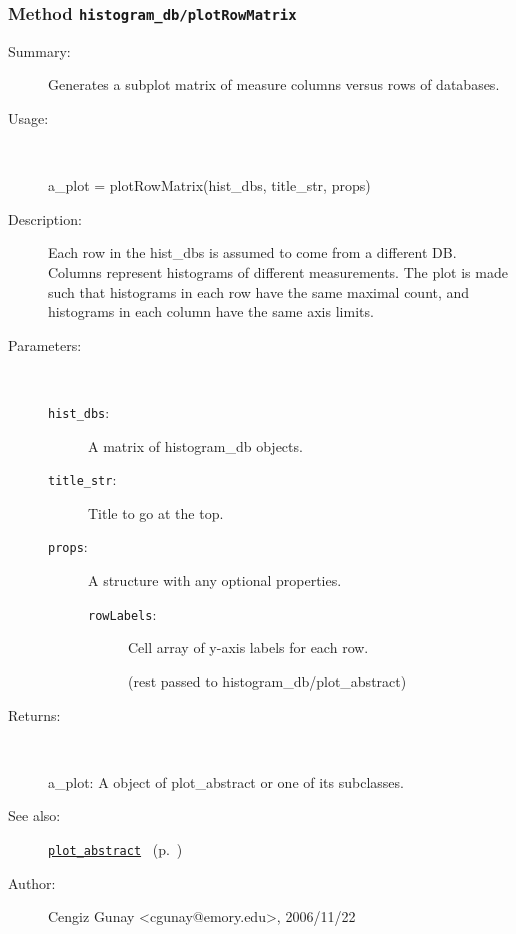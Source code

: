 \subsubsection[Method \texttt{plotRowMatrix}]{Method \texttt{histogram\_db/plotRowMatrix}}%
%
\label{ref_histogram_db__plotRowMatrix}%
\hypertarget{ref_histogram_db__plotRowMatrix}{}%
\begin{description}
\item[Summary:]Generates a subplot matrix of measure columns versus rows of databases. 
%
\item[Usage:]~%
\begin{lyxcode}%
a\_plot = plotRowMatrix(hist\_dbs, title\_str, props)
%
\end{lyxcode}%
%
\item[Description:]%
Each row in the hist\_dbs is assumed to come from a different DB. Columns represent histograms 
 of different measurements. The plot is made such that histograms in each row have the same
 maximal count, and histograms in each column have the same axis limits.
\item[Parameters:]~
\begin{description}%
\item[\texttt{hist\_dbs}:]
 A matrix of histogram\_db objects.
\item[\texttt{title\_str}:]
 Title to go at the top.
\item[\texttt{props}:]
 A structure with any optional properties.
\begin{description}%
\item[\texttt{rowLabels}:]
 Cell array of y-axis labels for each row.

(rest passed to histogram\_db/plot\_abstract)
\end{description}%
\end{description}%
%
\item[Returns:
]~

	a\_plot: A object of plot\_abstract or one of its subclasses.
%
%
\item[See also:]%
\hyperlink{ref_plot_abstract}{\texttt{plot\_abstract}}%
\ (p.~\pageref{ref_plot_abstract})%
%
%
\item[Author:]%
Cengiz Gunay <cgunay@emory.edu>, 2006/11/22
%
\end{description}
\methodline%
